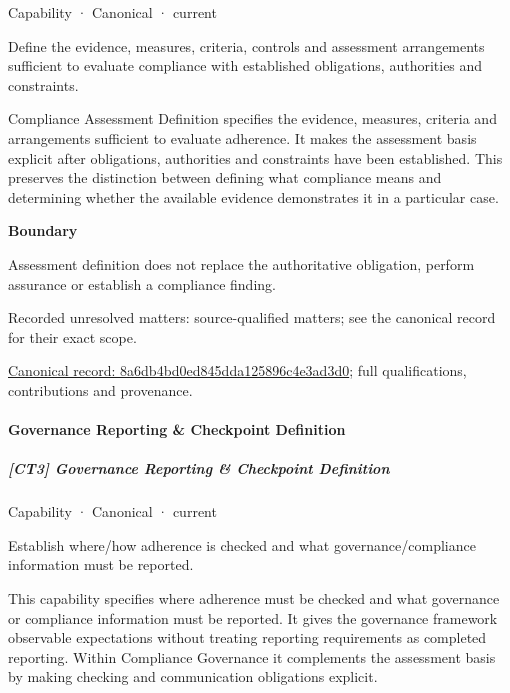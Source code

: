 \label{element:8a6db4bd0ed845dda125896c4e3ad3d0}
{\small Capability · Canonical · current}\par

Define the evidence, measures, criteria, controls and assessment arrangements sufficient to evaluate compliance with established obligations, authorities and constraints.



Compliance Assessment Definition specifies the evidence, measures, criteria and arrangements sufficient to evaluate adherence. It makes the assessment basis explicit after obligations, authorities and constraints have been established. This preserves the distinction between defining what compliance means and determining whether the available evidence demonstrates it in a particular case.



\textbf{Boundary}



Assessment definition does not replace the authoritative obligation, perform assurance or establish a compliance finding.


{\small Recorded unresolved matters: source-qualified matters; see the canonical record for their exact scope.}\par
{\footnotesize \href{../../../../continuum/strategy/capability/8a6db4bd0ed845dda125896c4e3ad3d0.md}{Canonical record: 8a6db4bd0ed845dda125896c4e3ad3d0}; full qualifications, contributions and provenance.}\par
\paragraph{Governance Reporting \& Checkpoint Definition}

\subparagraph{[CT3] Governance Reporting \& Checkpoint Definition}

\label{element:0ff9f332acdc435e98f4f527c74f60c9}
{\small Capability · Canonical · current}\par

Establish where/how adherence is checked and what governance/compliance information must be reported.



This capability specifies where adherence must be checked and what governance or compliance information must be reported. It gives the governance framework observable expectations without treating reporting requirements as completed reporting. Within Compliance Governance it complements the assessment basis by making checking and communication obligations explicit.



